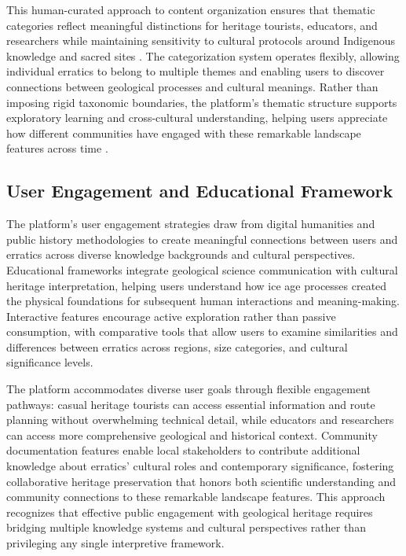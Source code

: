 This human-curated approach to content organization ensures that thematic categories reflect meaningful distinctions for heritage tourists, educators, and researchers while maintaining sensitivity to cultural protocols around Indigenous knowledge and sacred sites \cite{McInnes2018UMAP, Campello2013HDBSCAN}. The categorization system operates flexibly, allowing individual erratics to belong to multiple themes and enabling users to discover connections between geological processes and cultural meanings. Rather than imposing rigid taxonomic boundaries, the platform's thematic structure supports exploratory learning and cross-cultural understanding, helping users appreciate how different communities have engaged with these remarkable landscape features across time \cite{Blei2003, Roder2015}.

\subsection{User Engagement and Educational Framework}
\label{subsec:user_engagement}

The platform's user engagement strategies draw from digital humanities and public history methodologies to create meaningful connections between users and erratics across diverse knowledge backgrounds and cultural perspectives. Educational frameworks integrate geological science communication with cultural heritage interpretation, helping users understand how ice age processes created the physical foundations for subsequent human interactions and meaning-making. Interactive features encourage active exploration rather than passive consumption, with comparative tools that allow users to examine similarities and differences between erratics across regions, size categories, and cultural significance levels.

The platform accommodates diverse user goals through flexible engagement pathways: casual heritage tourists can access essential information and route planning without overwhelming technical detail, while educators and researchers can access more comprehensive geological and historical context. Community documentation features enable local stakeholders to contribute additional knowledge about erratics' cultural roles and contemporary significance, fostering collaborative heritage preservation that honors both scientific understanding and community connections to these remarkable landscape features. This approach recognizes that effective public engagement with geological heritage requires bridging multiple knowledge systems and cultural perspectives rather than privileging any single interpretive framework.


